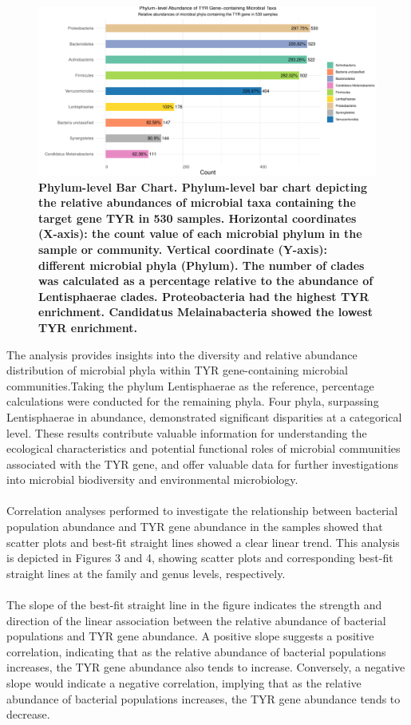 \documentclass[12pt]{article}
\begin{document}
\begin{figure}[H]
    \centering
    \includegraphics[width=1\linewidth]{pic/phylum.pdf} 
    \caption{\small\bfseries Phylum-level Bar Chart. Phylum-level bar chart depicting the relative abundances of microbial taxa containing the target gene TYR in 530 samples. Horizontal coordinates (X-axis): the count value of each microbial phylum in the sample or community. Vertical coordinate (Y-axis): different microbial phyla (Phylum). The number of clades was calculated as a percentage relative to the abundance of Lentisphaerae clades. Proteobacteria had the highest TYR enrichment. Candidatus Melainabacteria showed the lowest TYR enrichment.}
\end{figure}

The analysis provides insights into the diversity and relative abundance distribution of microbial phyla within TYR gene-containing microbial communities.Taking the phylum Lentisphaerae as the reference, percentage calculations were conducted for the remaining phyla. Four phyla, surpassing Lentisphaerae in abundance, demonstrated significant disparities at a categorical level. These results contribute valuable information for understanding the ecological characteristics and potential functional roles of microbial communities associated with the TYR gene, and offer valuable data for further investigations into microbial biodiversity and environmental microbiology.\\\\
Correlation analyses performed to investigate the relationship between bacterial population abundance and TYR gene abundance in the samples showed that scatter plots and best-fit straight lines showed a clear linear trend. This analysis is depicted in Figures 3 and 4, showing scatter plots and corresponding best-fit straight lines at the family and genus levels, respectively.\\\\
The slope of the best-fit straight line in the figure indicates the strength and direction of the linear association between the relative abundance of bacterial populations and TYR gene abundance. A positive slope suggests a positive correlation, indicating that as the relative abundance of bacterial populations increases, the TYR gene abundance also tends to increase. Conversely, a negative slope would indicate a negative correlation, implying that as the relative abundance of bacterial populations increases, the TYR gene abundance tends to decrease.
\end{document}
